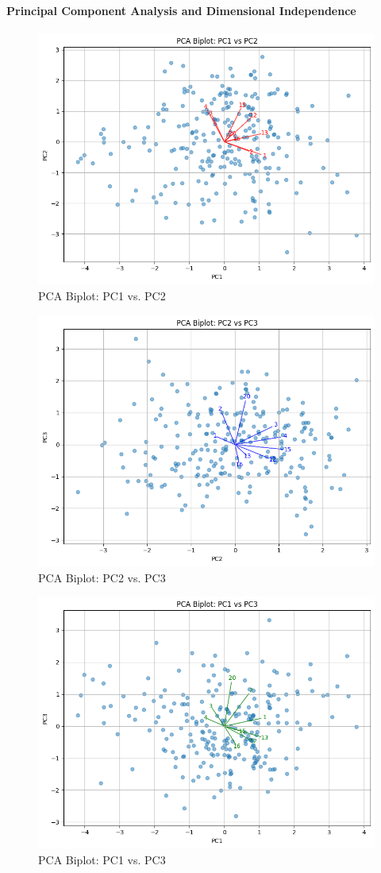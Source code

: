 	\paragraph{Principal Component Analysis and Dimensional Independence}
	\begin{figure}[h!]\centering
		\includegraphics[width=0.7\linewidth]{figures/img/factor_analysis/pca_biplot_pc1_vs_pc2.png}
		\caption{PCA Biplot: PC1 vs. PC2}
		\label{fig:pca_biplot_pc1_vs_pc2}
	\end{figure}
	\begin{figure}[h!]\centering
		\includegraphics[width=0.7\linewidth]{figures/img/factor_analysis/pca_biplot_pc2_vs_pc3.png}
		\caption{PCA Biplot: PC2 vs. PC3}
		\label{fig:pca_biplot_pc2_vs_pc3}
	\end{figure}
	\begin{figure}[h!]\centering
		\includegraphics[width=0.7\linewidth]{figures/img/factor_analysis/pca_biplot_pc1_vs_pc3.png}
		\caption{PCA Biplot: PC1 vs. PC3}
		\label{fig:pca_biplot_pc1_vs_pc3}
	\end{figure}
